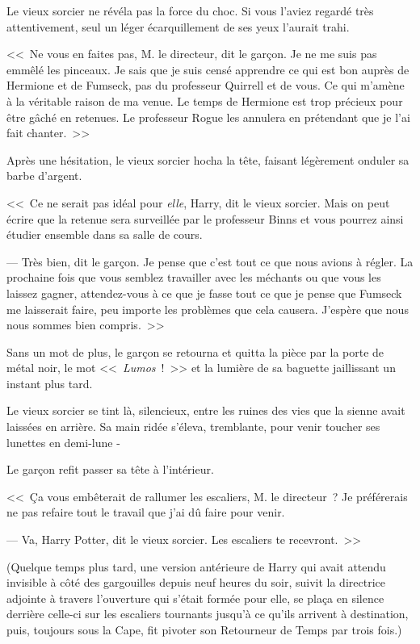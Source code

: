 Le vieux sorcier ne révéla pas la force du choc. Si vous l'aviez regardé très attentivement, seul un léger écarquillement de ses yeux l'aurait trahi.

<<~Ne vous en faites pas, M. le directeur, dit le garçon. Je ne me suis pas emmêlé les pinceaux. Je sais que je suis censé apprendre ce qui est bon auprès de Hermione et de Fumseck, pas du professeur Quirrell et de vous. Ce qui m'amène à la véritable raison de ma venue. Le temps de Hermione est trop précieux pour être gâché en retenues. Le professeur Rogue les annulera en prétendant que je l'ai fait chanter.~>>

Après une hésitation, le vieux sorcier hocha la tête, faisant légèrement onduler sa barbe d'argent.

<<~Ce ne serait pas idéal pour \emph{elle}, Harry, dit le vieux sorcier. Mais on peut écrire que la retenue sera surveillée par le professeur Binns et vous pourrez ainsi étudier ensemble dans sa salle de cours.

--- Très bien, dit le garçon. Je pense que c'est tout ce que nous avions à régler. La prochaine fois que vous semblez travailler avec les méchants ou que vous les laissez gagner, attendez-vous à ce que je fasse tout ce que je pense que Fumseck me laisserait faire, peu importe les problèmes que cela causera. J'espère que nous nous sommes bien compris.~>>

Sans un mot de plus, le garçon se retourna et quitta la pièce par la porte de métal noir, le mot <<~\emph{Lumos}~!~>> et la lumière de sa baguette jaillissant un instant plus tard.

Le vieux sorcier se tint là, silencieux, entre les ruines des vies que la sienne avait laissées en arrière. Sa main ridée s'éleva, tremblante, pour venir toucher ses lunettes en demi-lune -

Le garçon refit passer sa tête à l'intérieur.

<<~Ça vous embêterait de rallumer les escaliers, M. le directeur~? Je préférerais ne pas refaire tout le travail que j'ai dû faire pour venir.

--- Va, Harry Potter, dit le vieux sorcier. Les escaliers te recevront.~>>

(Quelque temps plus tard, une version antérieure de Harry qui avait attendu invisible à côté des gargouilles depuis neuf heures du soir, suivit la directrice adjointe à travers l'ouverture qui s'était formée pour elle, se plaça en silence derrière celle-ci sur les escaliers tournants jusqu'à ce qu'ils arrivent à destination, puis, toujours sous la Cape, fit pivoter son Retourneur de Temps par trois fois.)

